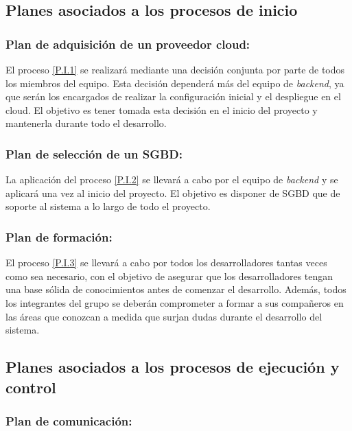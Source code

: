 \documentclass{article}
\begin{document}
\subsection{Planes asociados a los procesos de inicio}

\subsubsection{Plan de adquisición de un proveedor cloud:} \label{PL.I.1}

El proceso \ref{P.I.1} se realizará mediante una decisión conjunta por parte de todos los miembros del equipo. Esta decisión dependerá más del equipo de \textit{backend}, ya que serán los encargados de realizar la configuración inicial y el despliegue en el cloud. El objetivo es tener tomada esta decisión en el inicio del proyecto y mantenerla durante todo el desarrollo.
 
\subsubsection{Plan de selección de un SGBD:}  \label{PL.I.2}

La aplicación del proceso \ref{P.I.2} se llevará a cabo por el equipo de \textit{backend} y se aplicará una vez al inicio del proyecto. El objetivo es disponer de SGBD que de soporte al sistema a lo largo de todo el proyecto.

\subsubsection{Plan de formación:} \label{PL.I.3}

El proceso \ref{P.I.3} se llevará a cabo por todos los desarrolladores tantas veces como sea necesario, con el objetivo de asegurar que los desarrolladores tengan una base sólida de conocimientos antes de comenzar el desarrollo. Además, todos los integrantes del grupo se deberán comprometer a formar a sus compañeros en las áreas que conozcan a medida que surjan dudas durante el desarrollo del sistema.

\subsection{Planes asociados a los procesos de ejecución y control}

\subsubsection{Plan de comunicación:} \label{PL.EC.1}
\end{document}
